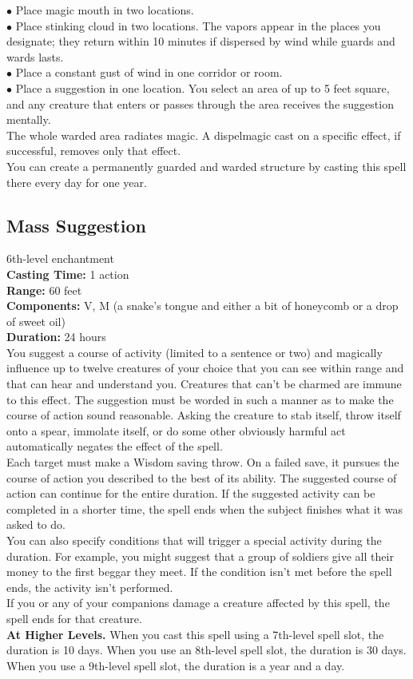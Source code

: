 \documentclass[11pt, A4paper, english]{article}
\begin{document}
\indent $\bullet$ Place magic mouth in two locations. \\
\indent $\bullet$ Place stinking cloud in two locations. The vapors appear in the places you designate; they return within 10 minutes if dispersed by wind while guards and wards lasts. \\
\indent $\bullet$ Place a constant gust of  wind in one corridor or room. \\
\indent $\bullet$ Place a suggestion in one location. You select an area of up to 5 feet square, and any creature that enters or passes through the area receives the suggestion mentally. \\
The whole warded area radiates magic. A dispelmagic cast on a specific effect, if successful, removes only that effect. \\
You can create a permanently guarded and warded structure by casting this spell there every day for one year.

		\subsection{Mass Suggestion}
6th-level enchantment \\
\textbf{Casting Time:} 1 action \\
\textbf{Range:} 60 feet \\
\textbf{Components:} V, M (a snake’s tongue and either a bit of honeycomb or a drop of sweet oil) \\
\textbf{Duration:} 24 hours \\
You suggest a course of activity (limited to a sentence or two) and magically influence up to twelve creatures of your choice that you can see within range and that can hear and understand you. Creatures that can’t be charmed are immune to this effect. The suggestion must be worded in such a manner as to make the course of action sound reasonable. Asking the creature to stab itself, throw itself onto a spear, immolate itself, or do some other obviously harmful act automatically negates the effect of the spell. \\
Each target must make a Wisdom  saving throw. On a failed save, it pursues the course of action you described to the best of its ability. The suggested course of action can continue for the entire duration. If the suggested activity can be completed in a shorter time, the spell ends when the subject finishes what it was asked to do. \\
You can also specify conditions that will trigger a special activity during the duration. For example, you might suggest that a group of soldiers give all their money to the first beggar they meet. If the condition isn’t met before the spell ends, the activity isn’t performed. \\
If you or any of your companions damage a creature affected by this spell, the spell ends for that creature. \\
\textbf{At Higher Levels.} When you cast this spell using a 7th-level spell slot, the duration is 10 days. When you use an 8th-level spell slot, the duration is 30 days. When you use a 9th-level spell slot, the duration is a year and a day.
\end{document}

